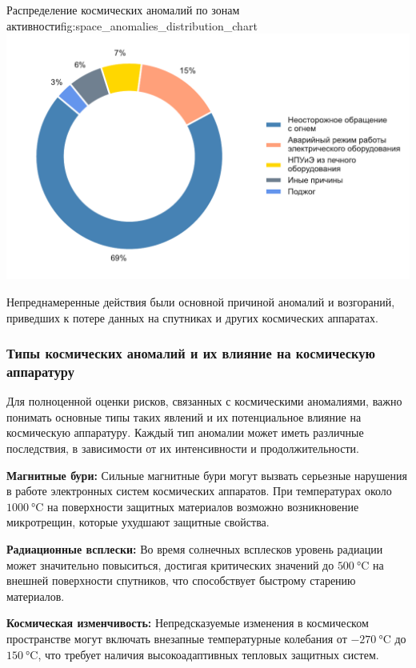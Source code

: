 \documentclass[]{../vvsu}
\begin{document}
\begin{vvsu_figure}{Распределение космических аномалий по зонам активности}{fig:space_anomalies_distribution_chart}
  \includegraphics[width=0.9\linewidth]{stats_fire_by_object_reasons.pdf}
\end{vvsu_figure}

Непреднамеренные действия были основной причиной аномалий и возгораний, приведших к потере данных на спутниках и других космических аппаратах.

\subsubsection{Типы космических аномалий и их влияние на космическую аппаратуру}

Для полноценной оценки рисков, связанных с космическими аномалиями, важно понимать основные типы таких явлений и их потенциальное влияние на космическую аппаратуру. Каждый тип аномалии может иметь различные последствия, в зависимости от их интенсивности и продолжительности.

\begin{vvsu_list}
  \item \textbf{Магнитные бури:} Сильные магнитные бури могут вызвать серьезные нарушения в работе электронных систем космических аппаратов. При температурах около $ \qty{1000}{\celsius} $ на поверхности защитных материалов возможно возникновение микротрещин, которые ухудшают защитные свойства.
  \item \textbf{Радиационные всплески:} Во время солнечных всплесков уровень радиации может значительно повыситься, достигая критических значений до $ \qty{500}{\celsius} $ на внешней поверхности спутников, что способствует быстрому старению материалов.
  \item \textbf{Космическая изменчивость:} Непредсказуемые изменения в космическом пространстве могут включать внезапные температурные колебания от $ \qty{-270}{\celsius} $ до $ \qty{150}{\celsius} $, что требует наличия высокоадаптивных тепловых защитных систем.
\end{vvsu_list}
\end{document}
